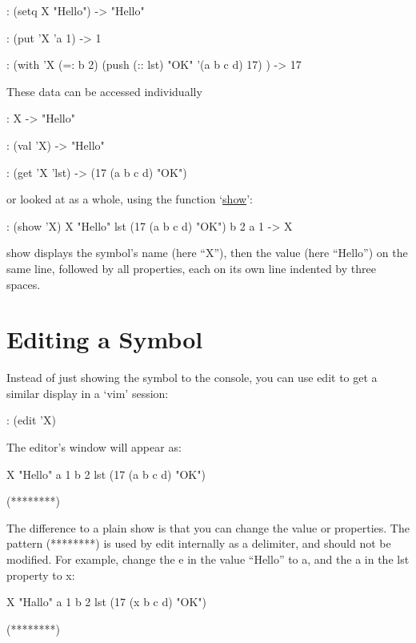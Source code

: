 \begin{wideverbatim}
: (setq X "Hello")
-> "Hello"

: (put 'X 'a 1)
-> 1

: (with 'X
   (=: b 2)
   (push (:: lst) "OK" '(a b c d) 17) )
-> 17
\end{wideverbatim}

These data can be accessed individually


\begin{wideverbatim}
: X
-> "Hello"

: (val 'X)
-> "Hello"

: (get 'X 'lst)
-> (17 (a b c d) "OK")
\end{wideverbatim}

or looked at as a whole, using the function
`\href{http://software-lab.de/doc/refS.html#show}{show}':


\begin{wideverbatim}
: (show 'X)
X "Hello"
   lst (17 (a b c d) "OK")
   b 2
   a 1
-> X
\end{wideverbatim}

show displays the symbol's name (here ``X''), then the value (here
``Hello'') on the same line, followed by all properties, each on its own
line indented by three spaces.


\section{Editing a Symbol}
\label{sec:edit-editing-a-symbol}


Instead of just showing the symbol to the console, you can use edit to
get a similar display in a `vim' session:


\begin{wideverbatim}
: (edit 'X)
\end{wideverbatim}

The editor's window will appear as:


\begin{wideverbatim}
X "Hello"
   a 1
   b 2
   lst (17 (a b c d) "OK")

(********)
\end{wideverbatim}

The difference to a plain show is that you can change the value or
properties.
 The pattern (********) is used by edit internally as a delimiter, and
should not be modified.
 For example, change the e in the value ``Hello'' to a, and the a in the
lst property to x:


\begin{wideverbatim}
X "Hallo"
   a 1
   b 2
   lst (17 (x b c d) "OK")

(********)
\end{wideverbatim}

